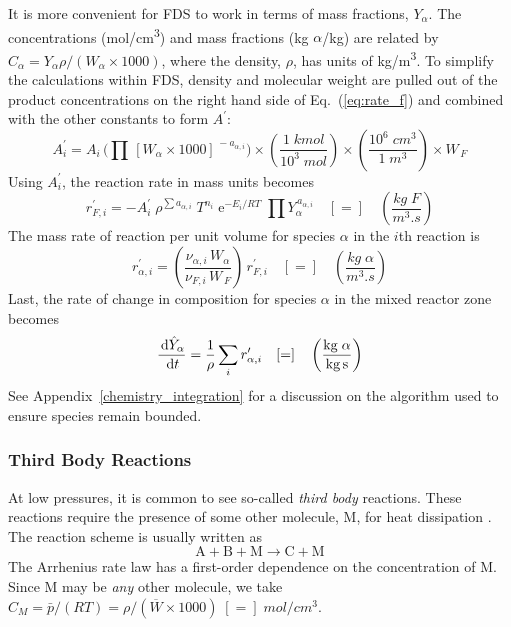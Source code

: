 It is more convenient for FDS to work in terms of mass fractions, $Y_{\alpha}$.  The concentrations (\si{mol/cm^3}) and mass fractions (kg $\alpha$/kg) are related by $C_{\alpha}=Y_{\alpha} \rho/(W_{\alpha} \times 1000)$, where the density, $\rho$, has units of \si{kg/m^3}.
To simplify the calculations within FDS, density and molecular weight are pulled out of the product concentrations on the right hand side of Eq.~(\ref{eq:rate_f}) and combined with the other constants to form $A^{\prime}$:
\begin{equation}\label{eq:aprime}
A^{\prime}_{i} = A_{i} \, \bigg( \prod \, [W_{\alpha} \times 1000]^{\,-a_{\alpha,i}} \bigg) \times \left(\frac{1 \; \si{kmol}}{10^3 \; \si{mol}}\right) \times \left(\frac{10^6 \; \si{cm^3}}{1 \; \si{m^3}}\right) \times W_{\,\si{F}}
\end{equation}
Using $A_i^{\prime}$, the reaction rate in mass units becomes
\begin{equation}\label{eq:finite_rate_fin}
r^{\prime}_{\si{F},i} = -A_i^{\prime}\;\rho^{\sum a_{\alpha,i}}\;T^{n_i}\;\mathrm{e}^{-E_i/RT}\;\prod Y_{\alpha}^{\,a_{\alpha,i}} \quad [=] \quad \left(\frac{\si{kg \; F}}{\si{m^3.s}}\right)
\end{equation}
The mass rate of reaction per unit volume for species $\alpha$ in the $i$th reaction is
\begin{equation}\label{eq:rate_a_y}
r^{\prime}_{\alpha,i}= \left(\frac{\nu_{\alpha,i}\,W_{\alpha}}{\nu_{\si{F},i}\,W_{\,\si{F}}}\right)\,r^{\prime}_{\si{F},i} \quad [=] \quad \left(\frac{\si{kg \; \alpha}}{\si{m^3.s}}\right)
\end{equation}
Last, the rate of change in composition for species $\alpha$ in the mixed reactor zone becomes
\begin{equation}\label{rate_expression_y}
\frac{\d \hat{Y}_{\alpha}}{\d t} = \frac{1}{\rho}\sum_{i} r^{\prime}_{\alpha,i} \quad [=] \quad \left(\frac{\si{kg \; \alpha}}{\si{kg.s}}\right)
\end{equation}
See Appendix~\ref{chemistry_integration} for a discussion on the algorithm used to ensure species remain bounded.

\subsubsection{Third Body Reactions}

At low pressures, it is common to see so-called \emph{third body} reactions.  These reactions require the presence of some other molecule, M, for heat dissipation \cite{Turns:1996}.  The reaction scheme is usually written as
\begin{equation}\label{eq:third_body}
\mathrm{A} + \mathrm{B} + \mathrm{M} \rightarrow \mathrm{C} + \mathrm{M}
\end{equation}
The Arrhenius rate law has a first-order dependence on the concentration of M.  Since M may be \emph{any} other molecule, we take $C_{\si{M}} = \bar{p}/(R T) = \rho/(\overline{W} \times 1000) \;[=]\;\si{mol/cm^3}$.

